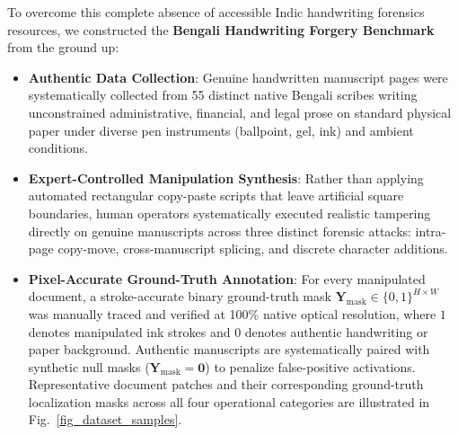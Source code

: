 \documentclass[pdflatex,sn-mathphys-num,iicol]{sn-jnl}
\begin{document}
To overcome this complete absence of accessible Indic handwriting forensics resources, we constructed the \textbf{Bengali Handwriting Forgery Benchmark} from the ground up:
\begin{itemize}
    \item \textbf{Authentic Data Collection}: Genuine handwritten manuscript pages were systematically collected from 55 distinct native Bengali scribes writing unconstrained administrative, financial, and legal prose on standard physical paper under diverse pen instruments (ballpoint, gel, ink) and ambient conditions.
    \item \textbf{Expert-Controlled Manipulation Synthesis}: Rather than applying automated rectangular copy-paste scripts that leave artificial square boundaries, human operators systematically executed realistic tampering directly on genuine manuscripts across three distinct forensic attacks: intra-page copy-move, cross-manuscript splicing, and discrete character additions.
    \item \textbf{Pixel-Accurate Ground-Truth Annotation}: For every manipulated document, a stroke-accurate binary ground-truth mask $\mathbf{Y}_{\text{mask}} \in \{0, 1\}^{H \times W}$ was manually traced and verified at 100\% native optical resolution, where $1$ denotes manipulated ink strokes and $0$ denotes authentic handwriting or paper background. Authentic manuscripts are systematically paired with synthetic null masks ($\mathbf{Y}_{\text{mask}} = \mathbf{0}$) to penalize false-positive activations. Representative document patches and their corresponding ground-truth localization masks across all four operational categories are illustrated in Fig.~\ref{fig_dataset_samples}.
\end{itemize}
\end{document}
